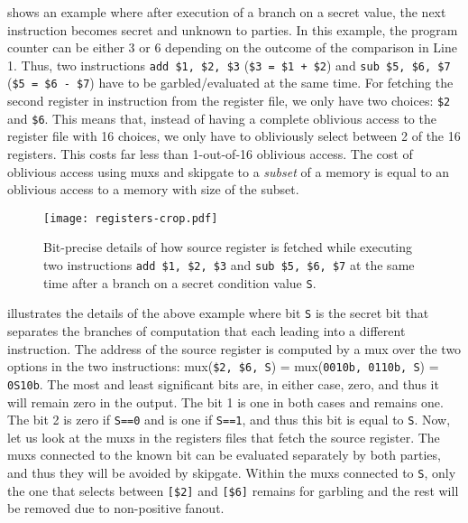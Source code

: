  shows an example where after execution of a branch on a secret value, the next instruction becomes secret and unknown to parties.
In this example, the program counter can be either 3 or 6 depending on the outcome of the comparison in Line 1.
Thus, two instructions \texttt{add \$1, \$2, \$3} (\texttt{\$3 = \$1 + \$2}) and \texttt{sub \$5, \$6, \$7} (\texttt{\$5 = \$6 - \$7}) have to be garbled/evaluated at the same time.
For fetching the second register in instruction from the register file, we only have two choices: \texttt{\$2} and \texttt{\$6}.
This means that, instead of having a complete oblivious access to the register file with 16 choices, we only have to obliviously select between 2 of the 16 registers.
This costs far less than 1-out-of-16 oblivious access.
The cost of oblivious access using \acrshort{mux}s and \gls{skipgate} to a {\it subset} of a memory is equal to an oblivious access to a memory with size of the subset.

\begin{figure}[h]
\centering
\texttt{[image: registers-crop.pdf]}
\caption{Bit-precise details of how source register is fetched while executing two instructions \texttt{add \$1, \$2, \$3} and \texttt{sub \$5, \$6, \$7} at the same time after a branch on a secret condition value \texttt{S}.}
\label{fig:registers}
\end{figure}

 illustrates the details of the above example where bit \texttt{S} is the secret bit that separates the branches of computation that each leading into a different instruction.
The address of the source register is computed by a \acrshort{mux} over the two options in the two instructions: \acrshort{mux}(\texttt{\$2, \$6, S}) = \acrshort{mux}(\texttt{0010b, 0110b, S}) = \texttt{0S10b}.
The most and least significant bits are, in either case, zero, and thus it will remain zero in the output.
The bit 1 is one in both cases and remains one.
The bit 2 is zero if \texttt{S==0} and is one if \texttt{S==1}, and thus this bit is equal to \texttt{S}.
Now, let us look at the \acrshort{mux}s in the registers files that fetch the source register.
The \acrshort{mux}s connected to the known bit can be evaluated separately by both parties, and thus they will be avoided by \gls{skipgate}.
Within the \acrshort{mux}s connected to \texttt{S}, only the one that selects between \texttt{[\$2]} and \texttt{[\$6]} remains for garbling and the rest will be removed due to non-positive fanout.


